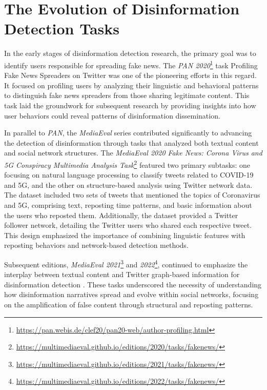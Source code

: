 \documentclass{Configuration_Files/PoliMi3i_thesis}
\begin{document}
\section{The Evolution of Disinformation Detection Tasks} \label{sec:evolution_disinformation_detection_task} In the early stages of disinformation detection research, the primary goal was to identify users responsible for spreading fake news. The \textit{PAN 2020}\footnote{\url{https://pan.webis.de/clef20/pan20-web/author-profiling.html}} task Profiling Fake News Spreaders on Twitter \cite{rangel2020overview} was one of the pioneering efforts in this regard. It focused on profiling users by analyzing their linguistic and behavioral patterns to distinguish fake news spreaders from those sharing legitimate content. This task laid the groundwork for subsequent research by providing insights into how user behaviors could reveal patterns of disinformation dissemination.

In parallel to \textit{PAN}, the \textit{MediaEval} series contributed significantly to advancing the detection of disinformation through tasks that analyzed both textual content and social network structures. The \textit{MediaEval 2020 Fake News: Corona Virus and 5G Conspiracy Multimedia Analysis Task}\footnote{\url{https://multimediaeval.github.io/editions/2020/tasks/fakenews/}} \cite{pogorelov2020fakenews} featured two primary subtasks: one focusing on natural language processing to classify tweets related to COVID-19 and 5G, and the other on structure-based analysis using Twitter network data. The dataset included two sets of tweets that mentioned the topics of Coronavirus and 5G, comprising text, reposting time patterns, and basic information about the users who reposted them. Additionally, the dataset provided a Twitter follower network, detailing the Twitter users who shared each respective tweet. This design emphasized the importance of combining linguistic features with reposting behaviors and network-based detection methods.

Subsequent editions, \textit{MediaEval 2021}\footnote{\url{https://multimediaeval.github.io/editions/2021/tasks/fakenews/}} and \textit{2022}\footnote{\url{https://multimediaeval.github.io/editions/2022/tasks/fakenews/}}, continued to emphasize the interplay between textual content and Twitter graph-based information for disinformation detection \cite{pogorelov2021fakenews, pogorelov2022fakenews}. These tasks underscored the necessity of understanding how disinformation narratives spread and evolve within social networks, focusing on the amplification of false content through structural and reposting patterns.
\end{document}
